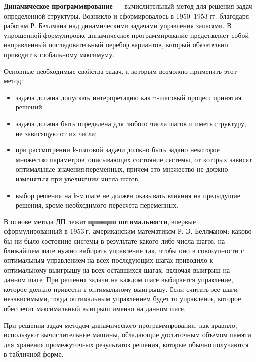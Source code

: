 \textbf{Динамическое программирование} --- вычислительный метод для решения задач
определенной структуры. Возникло и сформировалось в 1950--1953
гг. благодаря работам Р. Беллмана над динамическими задачами
управления запасами. В упрощенной формулировке динамическое
программирование представляет собой направленный последовательный
перебор вариантов, который обязательно приводит к глобальному
максимуму. 

Основные необходимые свойства задач, к которым возможно
применить этот метод:

\begin{itemize}
\setlength{\itemsep}{0.2ex}
\item задача должна допускать интерпретацию как
  n-шаговый процесс принятия решений;

\item задача должна быть определена для
  любого числа шагов и иметь структуру, не зависящую от их числа;

\item при рассмотрении k-шаговой задачи должно быть задано некоторое множество
  параметров, описывающих состояние системы, от которых зависят
  оптимальные значения переменных, причем это множество не должно
  изменяться при увеличении числа шагов;

\item выбор решения на k-м шаге не должен оказывать влияния на предыдущие решения, кроме
  необходимого пересчета переменных. 

\end{itemize}

 В основе метода ДП лежит \textbf{принцип оптимальности},
впервые сформулированный в 1953 г. американским
математиком Р. Э. Беллманом: каково бы ни было состояние системы в
результате какого-либо числа шагов, на ближайшем шаге нужно выбирать
управление так, чтобы оно в совокупности с оптимальным управлением на
всех последующих шагах приводило к оптимальному выигрышу на всех
оставшихся шагах, включая выигрыш на данном шаге. При решении задачи
на каждом шаге выбирается управление, которое должно привести к
оптимальному выигрышу. Если считать все шаги независимыми, тогда
оптимальным управлением будет то управление, которое обеспечит
максимальный выигрыш именно на данном шаге.

При решении задач методом динамического программирования, как
правило, используют вычислительные машины, обладающие достаточным
объемом памяти для хранения промежуточных результатов решения, которые
обычно получаются в табличной форме.

